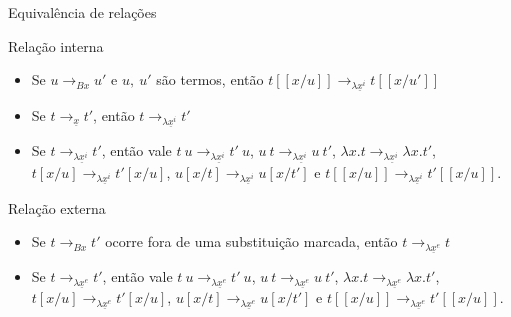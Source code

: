 \documentclass{beamer}
\begin{document}

\begin{frame}{Equivalência de relações}

    \begin{block}{Relação interna}
    \begin{itemize}
        \item Se $u \rightarrow_{Bx} u'$ e $u,\ u'$ são termos, então $t[\![x/u]\!]
            \rightarrow_{\lambda \underline{x}^i} t[\![x/u']\!]$ 
        \item Se $t
            \rightarrow_{\underline{x}} t'$, então $t \rightarrow_{\lambda
                \underline{x}^i} t'$
        \item Se $t \rightarrow_{\lambda \underline{x}^i} t'$, então vale 
            $t\ u \rightarrow_{\lambda \underline{x}^i} t'\ u$,  
            $u\ t \rightarrow_{\lambda \underline{x}^i} u\ t'$, 
            $\lambda x. t \rightarrow_{\lambda \underline{x}^i} \lambda x. t'$, 
            $t[x/u] \rightarrow_{\lambda \underline{x}^i} t'[x/u]$, 
            $u[x/t] \rightarrow_{\lambda \underline{x}^i} u[x/t']$ e 
            $t[\![x/u]\!] \rightarrow_{\lambda \underline{x}^i} t'[\![x/u]\!]$.
    \end{itemize}
    \end{block}

    \begin{block}{Relação externa}
    \begin{itemize}
        \item Se $t \rightarrow_{Bx} t'$ ocorre fora de uma substituição marcada, então 
            $t \rightarrow_{\lambda \underline{x}^e} t$ 
        \item Se $t \rightarrow_{\lambda \underline{x}^e} t'$, então vale 
            $t\ u \rightarrow_{\lambda \underline{x}^e} t'\ u$,  
            $u\ t \rightarrow_{\lambda \underline{x}^e} u\ t'$, 
            $\lambda x. t \rightarrow_{\lambda \underline{x}^e} \lambda x. t'$, 
            $t[x/u] \rightarrow_{\lambda \underline{x}^e} t'[x/u]$, 
            $u[x/t] \rightarrow_{\lambda \underline{x}^e} u[x/t']$ e 
            $t[\![x/u]\!] \rightarrow_{\lambda \underline{x}^e} t'[\![x/u]\!]$.
    \end{itemize}
    \end{block}
    
\end{frame}

\end{document}
